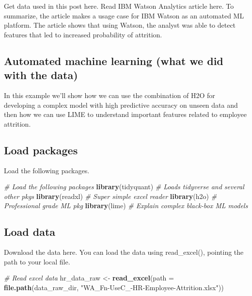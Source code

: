 \documentclass[]{book}
\newenvironment{Shaded}{\begin{snugshade}}{\end{snugshade}}
\newcommand{\CommentTok}[1]{\textcolor[rgb]{0.56,0.35,0.01}{\textit{#1}}}
\newcommand{\DataTypeTok}[1]{\textcolor[rgb]{0.13,0.29,0.53}{#1}}
\newcommand{\KeywordTok}[1]{\textcolor[rgb]{0.13,0.29,0.53}{\textbf{#1}}}
\newcommand{\NormalTok}[1]{#1}
\newcommand{\StringTok}[1]{\textcolor[rgb]{0.31,0.60,0.02}{#1}}
\begin{document}
Get data used in this post here.
Read IBM Watson Analytics article here.
To summarize, the article makes a usage case for IBM Watson as an automated ML platform. The article shows that using Watson, the analyst was able to detect features that led to increased probability of attrition.

\hypertarget{automated-machine-learning-what-we-did-with-the-data}{%
\subsection{Automated machine learning (what we did with the data)}\label{automated-machine-learning-what-we-did-with-the-data}}

In this example we'll show how we can use the combination of H2O for developing a complex model with high predictive accuracy on unseen data and then how we can use LIME to understand important features related to employee attrition.

\hypertarget{load-packages}{%
\subsection{Load packages}\label{load-packages}}

Load the following packages.

\begin{Shaded}
\begin{Highlighting}[]
\CommentTok{# Load the following packages}
\KeywordTok{library}\NormalTok{(tidyquant)  }\CommentTok{# Loads tidyverse and several other pkgs }
\KeywordTok{library}\NormalTok{(readxl)     }\CommentTok{# Super simple excel reader}
\KeywordTok{library}\NormalTok{(h2o)        }\CommentTok{# Professional grade ML pkg}
\KeywordTok{library}\NormalTok{(lime)       }\CommentTok{# Explain complex black-box ML models}
\end{Highlighting}
\end{Shaded}

\hypertarget{load-data}{%
\subsection{Load data}\label{load-data}}

Download the data here. You can load the data using read\_excel(), pointing the path to your local file.

\begin{Shaded}
\begin{Highlighting}[]
\CommentTok{# Read excel data}
\NormalTok{hr_data_raw <-}\StringTok{ }\KeywordTok{read_excel}\NormalTok{(}\DataTypeTok{path =} \KeywordTok{file.path}\NormalTok{(data_raw_dir,}
                                           \StringTok{"WA_Fn-UseC_-HR-Employee-Attrition.xlsx"}\NormalTok{))}
\end{Highlighting}
\end{Shaded}
\end{document}
